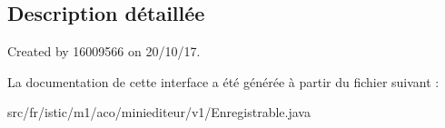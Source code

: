 \subsection{Description détaillée}
Created by 16009566 on 20/10/17. 

La documentation de cette interface a été générée à partir du fichier suivant \+:\begin{DoxyCompactItemize}
\item 
src/fr/istic/m1/aco/miniediteur/v1/Enregistrable.\+java\end{DoxyCompactItemize}
